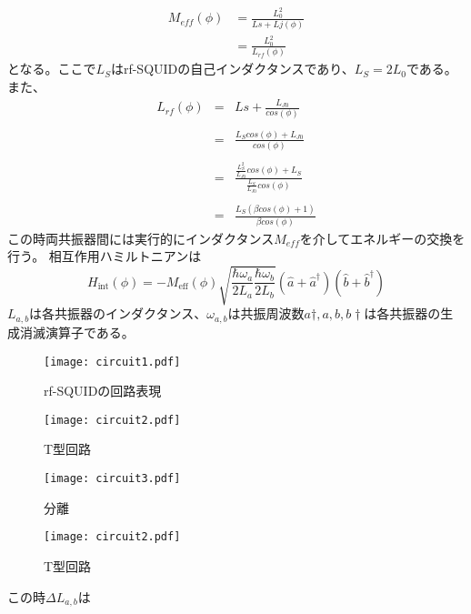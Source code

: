 \begin{eqnarray}
    M_{eff}(\phi) & = \frac{L_0^2}{Ls+Lj(\phi)}\\
    & =\frac{L_0^2}{L_{rf}(\phi)}
\end{eqnarray}
となる。ここで$L_S$はrf-SQUIDの自己インダクタンスであり、$L_S = 2 L_0$である。
また、
\begin{eqnarray}
    L_{rf}(\phi)  &=& Ls+\frac{L_{J0}}{cos(\phi)}\\ \\
    &=& \frac{L_S cos(\phi)+L_{J0}}{cos(\phi)}\\ \\
    &=& \frac{\frac{L_S^2}{L_{J0}} cos(\phi)+L_S}{\frac{L_S}{L_{J0}}cos(\phi)}\\ \\
    &=& \frac{L_S(\beta cos(\phi)+1)}{\beta cos(\phi)}
\end{eqnarray}
この時両共振器間には実行的にインダクタンス$M_{eff}$を介してエネルギーの交換を行う。
相互作用ハミルトニアンは
\begin{equation}
    H_{\mathrm{int}}(\phi)=-M_{\mathrm{eff}}(\phi) \sqrt{\frac{\hbar \omega_{a}}{2 L_{a}} \frac{\hbar \omega_{b}}{2 L_{b}}}\left(\hat{a}+\hat{a}^{\dagger}\right)\left(\hat{b}+\hat{b}^{\dagger}\right)
\end{equation}
$L_{a,b}$は各共振器のインダクタンス、$\omega_{a,b}$は共振周波数$a\dagger,a,b,b\dagger$は各共振器の生成消滅演算子である。
\begin{figure}[H]
    \begin{minipage}[t]{0.5\columnwidth}
        \centering
        \texttt{[image: circuit1.pdf]}
        \caption{rf-SQUIDの回路表現}
    \end{minipage}%
    \begin{minipage}[t]{0.5\columnwidth}
        \centering
        \texttt{[image: circuit2.pdf]}
        \caption{T型回路}
    \end{minipage}
\end{figure}
\begin{figure}[H]
    \begin{minipage}[t]{0.5\columnwidth}
        \centering
        \texttt{[image: circuit3.pdf]}
        \caption{分離}
    \end{minipage}%
    \begin{minipage}[t]{0.5\columnwidth}
        \centering
        \texttt{[image: circuit2.pdf]}
        \caption{T型回路}
    \end{minipage}
\end{figure}
この時$\Delta L_{a,b}$は

